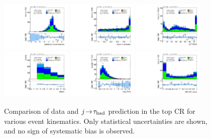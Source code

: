 \begin{figure}[tp]
  \includegraphics[width=0.30\textwidth]{figures/analysis/vbf-topCR/jets-etaprod}
  \includegraphics[width=0.30\textwidth]{figures/analysis/vbf-topCR/lep-eta-centrality}
  \includegraphics[width=0.30\textwidth]{figures/analysis/vbf-topCR/system-pt} \\
  \includegraphics[width=0.30\textwidth]{figures/analysis/vbf-topCR/n-jets30}
  \includegraphics[width=0.30\textwidth]{figures/analysis/vbf-topCR/dijet-m-veryhigh}
  \includegraphics[width=0.30\textwidth]{figures/analysis/vbf-topCR/BDTEve-VBF} \\
  \caption{Comparison of data and $j\!\rightarrow\!\tau_\text{had}$ prediction in the top CR for various event kinematics. Only statistical uncertainties are shown, and no sign of systematic bias is observed.}
  \label{fig:backgrounds-topCR-jets}
\end{figure}


